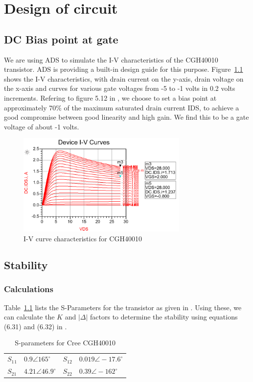 \chapter{Design of circuit}
  
  \section{DC Bias point at gate}

  We are using ADS to simulate the I-V characteristics of the CGH40010 transistor. ADS is providing a built-in design guide for this purpose. Figure~\ref{fig:fig_IV} shows the I-V characteristics, with drain current on the y-axis, drain voltage on the x-axis and curves for various gate voltages from -5 to -1 volts in 0.2 volts increments. Refering to figure 5.12 in \cite[p.~200]{AmpRobertson}, we choose to set a bias point at approximately 70\% of the maximum saturated drain current IDS, to achieve a good compromise between good linearity and high gain. We find this to be a gate voltage of about -1 volts.

  \begin{figure}[h]
	  \centering
	  \includegraphics[width=0.75\textwidth]{img/01_IVCurve}
	  \caption{I-V curve characteristics for CGH40010}
	  \label{fig:fig_IV}
  \end{figure}

  \section{Stability}

  \subsection{Calculations}
  Table~\ref{tab:cree_sparm} lists the S-Parameters for the transistor as given in \cite{CreeDS}. Using these, we can calculate the $K$ and $\lvert \Delta \rvert$ factors to determine the stability using equations (6.31) and (6.32) in \cite{Pozar}.
  \begin{table}[h]
	  \centering
  \begin{tabular}{l l l l}
	  $S_1$$_1$ & $0.9 \angle 165^{\circ}$ & $S_{12}$ & $0.019 \angle -17.6^{\circ}$ \\
	  $S_{21}$ & $4.21 \angle 46.9^{\circ}$ & $S_{22}$ & $0.39 \angle -162^{\circ}$ \\
  \end{tabular}
	  \caption{S-parameters for Cree CGH40010}
	  \label{tab:cree_sparm}

  \end{table}

